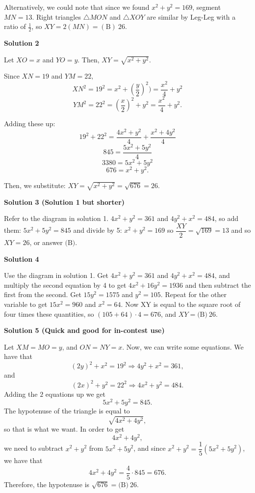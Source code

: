 \begin{enumerate}
 Alternatively, we could note that since we found $x^2 + y^2 = 169$, segment $MN=13$. Right triangles $\triangle MON$ and $\triangle XOY$ are similar by Leg-Leg with a ratio of $\frac{1}{2}$, so $XY=2(MN)=\boxed{\mathrm{(B)}\ 26}$.

 


 



\textbf{Solution 2}

Let $XO=x$ and $YO=y.$ Then, $XY=\sqrt{x^2+y^2}.$ 

 Since $XN=19$ and $YM=22,$ 
 \[XN^2=19^2=x^2+(\dfrac{y}{2})^2)=\dfrac{x^2}{4}+y^2\]
 \[YM^2=22^2=(\dfrac{x}{2})^2+y^2=\dfrac{x^2}{4}+y^2.\]

 Adding these up: 
 \[19^2+22^2=\dfrac{4x^2+y^2}{4}+\dfrac{x^2+4y^2}{4}\]
 \[845=\dfrac{5x^2+5y^2}{4}\]
 \[3380=5x^2+5y^2\]
 \[676=x^2+y^2.\] 

 Then, we substitute: $XY=\sqrt{x^2+y^2}=\sqrt{676}=\boxed{26}.$




\textbf{Solution 3 (Solution 1 but shorter)}

Refer to the diagram in solution 1. $4x^2+y^2=361$ and $4y^2+x^2=484$, so add them: $5x^2+5y^2=845$ and divide by 5: $x^2+y^2=169$ so $\dfrac{XY}{2}=\sqrt{169}=13$ and so $XY=26$, or answer $\boxed{\text{(B)}}$.

 



\textbf{Solution 4}

Use the diagram in solution 1. Get $4x^2+y^2=361$ and $4y^2+x^2=484$, and multiply the second equation by 4 to get $4x^2+16y^2=1936$ and then subtract the first from the second. Get $15y^2=1575$ and $y^2=105$. Repeat for the other variable to get $15x^2=960$ and $x^2=64$. Now XY is equal to the square root of four times these quantities, so $(105+64) \cdot 4=676$, and $XY=\boxed{\text{(B)}\ 26}$.

 



\textbf{Solution 5 (Quick and good for in-contest use)}

Let $XM = MO = y$, and $ON = NY  = x$. Now, we can write some equations. We have that 
 \[(2y)^2+x^2 = 19^2 \Longrightarrow 4y^2 + x^2 = 361,\] and 
 \[(2x)^2+y^2 = 22^2 \Longrightarrow 4x^2+y^2 = 484.\] Adding the $2$ equations up we get 
 \[5x^2+5y^2 = 845.\] The hypotenuse of the triangle is equal to 
 \[\sqrt{4x^2+4y^2},\] so that is what we want. In order to get 
 \[4x^2+4y^2,\] we need to subtract $x^2+y^2$ from $5x^2+5y^2$, and since $x^2+y^2 = \dfrac{1}{5}\left(5x^2+5y^2\right)$, we have that 
 \[4x^2+4y^2 = \dfrac{4}{5} \cdot 845 = 676.\] Therefore, the hypotenuse is $\sqrt{676} = \boxed{\text{(B)}\ 26}$.


\end{enumerate}
